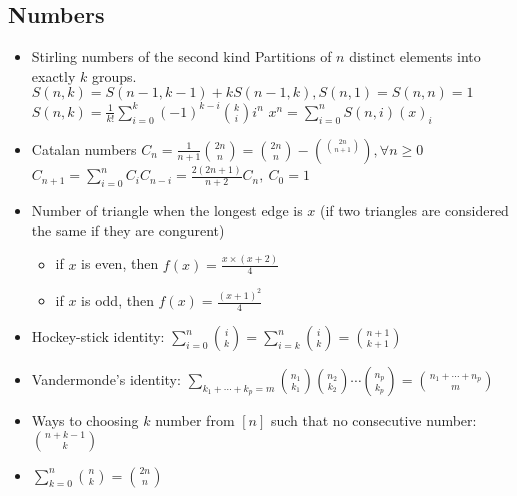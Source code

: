 \documentclass[10pt, a4paper, twocolumn, oneside]{article}
\begin{document}
\subsection{Numbers}
\begin{itemize}
\item Stirling numbers of the second kind
Partitions of $n$ distinct elements into exactly $k$ groups. 
$S(n, k) = S(n - 1, k - 1) + kS(n - 1, k), S(n, 1) = S(n, n) = 1$
$S(n, k) = \frac{1}{k!}\sum_{i=0}^{k}(-1)^{k-i}{k \choose i}i^n$
$x^n     = \sum_{i=0}^{n} S(n, i) (x)_i$
\item Catalan numbers
$C_n = \frac{1}{n+1}{2n \choose n} = {2n \choose n}-\binom{2n \choose n+1}\ , \forall n \geq 0 $
$C_{n+1} = \sum_{i=0}^{n} C_iC_{n-i} = \frac{2(2n+1)}{n+2}C_n,\ C_0 = 1$
\item Number of triangle when the longest edge is $x$ (if two triangles are considered the same if they are congurent)
\begin{itemize}
    \itemsep-0.5em
  \item if $x$ is even, then $f(x) = \frac{x \times (x + 2)}{4}$
  \item if $x$ is odd, then $f(x) = \frac{(x + 1)^2}{4}$
\end{itemize}
\item Hockey-stick identity: $\displaystyle\sum_{i = 0}^n {i\choose k} = \displaystyle\sum_{i = k}^n {i \choose k} = {{n + 1}\choose{k + 1}}$
\item Vandermonde's identity: $\displaystyle\sum_{k_1 + \cdots + k_p = m} {{n_1}\choose{k_1}}{{n_2}\choose{k_2}} \cdots {{n_p}\choose{k_p}} = {{n_1 + \cdots + n_p}\choose m}$
\item Ways to choosing $k$ number from $[n]$ such that no consecutive number: ${{n + k - 1}\choose k}$
\item $\displaystyle\sum_{k = 0}^n {n\choose k} = {{2n}\choose n}$
\end{itemize}
\end{document}
